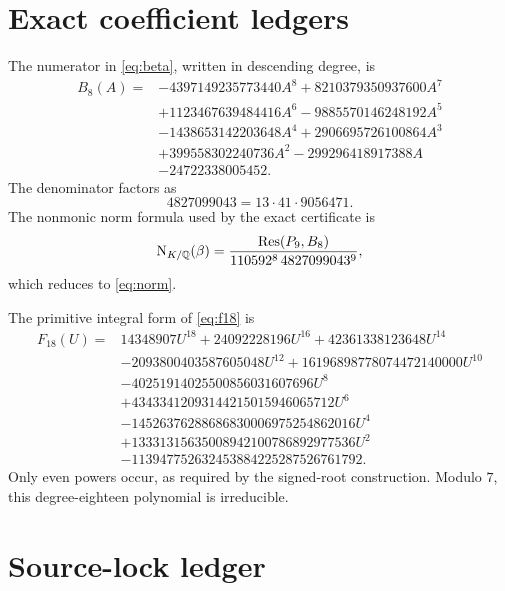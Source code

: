 \section{Exact coefficient ledgers}\label{app:ledgers}

The numerator in \eqref{eq:beta}, written in descending degree, is
\begin{align*}
B_8(A)={}&-4397149235773440A^8+8210379350937600A^7\\
&+1123467639484416A^6-9885570146248192A^5\\
&-1438653142203648A^4+2906695726100864A^3\\
&+399558302240736A^2-299296418917388A\\
&-24722338005452.
\end{align*}
The denominator factors as
\[
4827099043=13\cdot41\cdot9056471.
\]
The nonmonic norm formula used by the exact certificate is
\[
 \operatorname{N}_{K/\mathbb{Q}}(\beta)
 =\frac{\operatorname{Res}(P_9,B_8)}
 {110592^8\,4827099043^9},
\]
which reduces to \eqref{eq:norm}.

The primitive integral form of \eqref{eq:f18} is
\begin{align*}
F_{18}(U)={}&14348907U^{18}+24092228196U^{16}
 +42361338123648U^{14}\\
&-2093800403587605048U^{12}
 +16196898778074472140000U^{10}\\
&-40251914025500856031607696U^8\\
&+43433412093144215015946065712U^6\\
&-14526376288686830006975254862016U^4\\
&+13331315635008942100786892977536U^2\\
&-113947752632453884225287526761792.
\end{align*}
Only even powers occur, as required by the signed-root construction.  Modulo
\(7\), this degree-eighteen polynomial is irreducible.

\section{Source-lock ledger}


